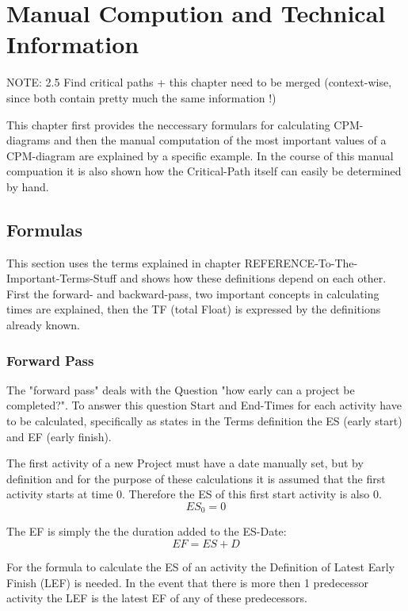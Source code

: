 \section{Manual Compution and Technical Information}

NOTE: 2.5 Find critical paths + this chapter need to be merged (context-wise, since both contain pretty much the same information !)


This chapter first provides the neccessary formulars for calculating CPM-diagrams and then the manual computation of the most important values of a CPM-diagram are explained by a specific example. In the course of this manual compuation it is also shown how the Critical-Path itself can easily be determined by hand.

\subsection{Formulas} \label{formulas}

This section uses the terms explained in chapter REFERENCE-To-The-Important-Terms-Stuff and shows how these definitions depend on each other.
First the forward- and backward-pass, two important concepts in calculating times are explained, then the TF (total Float) is expressed by the definitions already known.
\subsubsection{Forward Pass} \label{forwardPass}
The "forward pass" deals with the Question "how early can a project be completed?". To answer this question Start and End-Times for each activity have to be calculated, specifically as states in the Terms definition the ES (early start) and EF (early finish).

The first activity of a new Project must have a date manually set, but by definition and for the purpose of these calculations it is assumed that the first activity starts at time 0. Therefore the ES of this first start activity is also 0.
\begin{equation}
ES_{0} = 0
\end{equation}

The EF is simply the the duration added to the ES-Date:
\begin{equation}
EF = ES + D
\end{equation}

For the formula to calculate the ES of an activity the Definition of Latest Early Finish (LEF) is needed. In the event that there is more then 1 predecessor activity the LEF is the latest EF of any of these predecessors.

